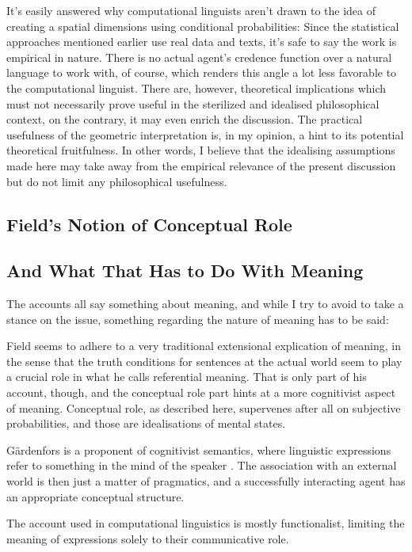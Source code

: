 \documentclass[11pt, a4paper]{scrartcl}
\begin{document}
It's easily answered why computational linguists aren't drawn to the idea of creating a spatial dimensions using conditional probabilities: Since the statistical approaches mentioned earlier use real data and texts, it's safe to say the work is empirical in nature. There is no actual agent's credence function over a natural language to work with, of course, which renders this angle a lot less favorable to the computational linguist. There are, however, theoretical implications which must not necessarily prove useful in the sterilized and idealised philosophical context, on the contrary, it may even enrich the discussion. The practical usefulness of the geometric interpretation is, in my opinion, a hint to its potential theoretical fruitfulness. In other words, I believe that the idealising assumptions made here may take away from the empirical relevance of the present discussion but do not limit any philosophical usefulness.

\subsection{Field's Notion of Conceptual Role}
\subsection{And What That Has to Do With Meaning}

The accounts all say something about meaning, and while I try to avoid to take a stance on the issue, something regarding the nature of meaning has to be said: 

Field seems to adhere to a very traditional extensional explication of meaning, in the sense that the truth conditions for sentences at the actual world seem to play a crucial role in what he calls referential meaning. That is only part of his account, though, and the conceptual role part hints at a more cognitivist aspect of meaning. Conceptual role, as described here, supervenes after all on subjective probabilities, and those are idealisations of mental states. 

Gärdenfors is a proponent of cognitivist semantics, where linguistic expressions refer to something in the mind of the speaker \parencite[154]{gärdenfors2004conceptual}. The association with an external world is then just a matter of pragmatics, and a successfully interacting agent has an appropriate conceptual structure. 

The account used in computational linguistics is mostly functionalist, limiting the meaning of expressions solely to their communicative role. 
\end{document}
